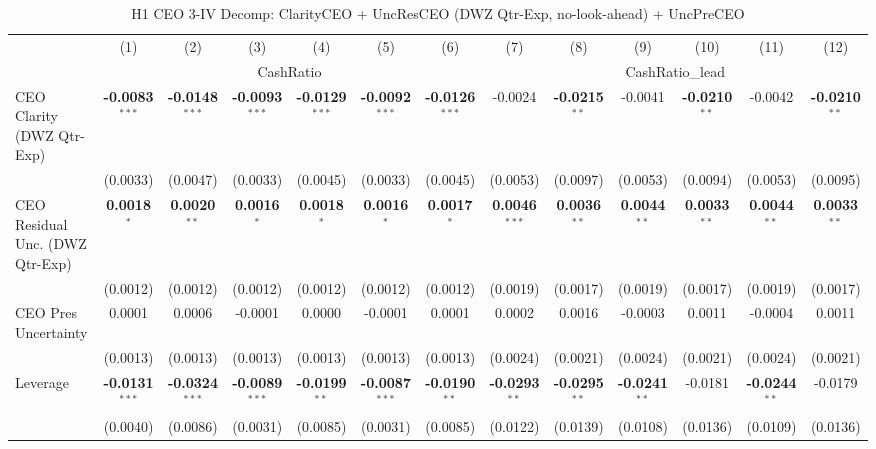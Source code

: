 \begin{landscape}
\begin{table}[H]
\setlength{\tabcolsep}{3pt}
\renewcommand{\arraystretch}{0.85}
\centering
\caption{H1 CEO 3-IV Decomp: ClarityCEO + UncResCEO (DWZ Qtr-Exp, no-look-ahead) + UncPreCEO}
\label{tab:h1_ceo2_decomp_qtrexp}
\scriptsize
\begin{tabular}{lcccccccccccc}
\toprule
 & (1) & (2) & (3) & (4) & (5) & (6) & (7) & (8) & (9) & (10) & (11) & (12) \\
 & \multicolumn{6}{c}{CashRatio} & \multicolumn{6}{c}{CashRatio\_lead} \\
\cmidrule(lr){2-7} \cmidrule(lr){8-13}
\midrule
CEO Clarity (DWZ Qtr-Exp) & \textbf{-0.0083}$^{***}$ & \textbf{-0.0148}$^{***}$ & \textbf{-0.0093}$^{***}$ & \textbf{-0.0129}$^{***}$ & \textbf{-0.0092}$^{***}$ & \textbf{-0.0126}$^{***}$ & -0.0024 & \textbf{-0.0215}$^{**}$ & -0.0041 & \textbf{-0.0210}$^{**}$ & -0.0042 & \textbf{-0.0210}$^{**}$ \\
 & (0.0033) & (0.0047) & (0.0033) & (0.0045) & (0.0033) & (0.0045) & (0.0053) & (0.0097) & (0.0053) & (0.0094) & (0.0053) & (0.0095) \\
CEO Residual Unc. (DWZ Qtr-Exp) & \textbf{0.0018}$^{*}$ & \textbf{0.0020}$^{**}$ & \textbf{0.0016}$^{*}$ & \textbf{0.0018}$^{*}$ & \textbf{0.0016}$^{*}$ & \textbf{0.0017}$^{*}$ & \textbf{0.0046}$^{***}$ & \textbf{0.0036}$^{**}$ & \textbf{0.0044}$^{**}$ & \textbf{0.0033}$^{**}$ & \textbf{0.0044}$^{**}$ & \textbf{0.0033}$^{**}$ \\
 & (0.0012) & (0.0012) & (0.0012) & (0.0012) & (0.0012) & (0.0012) & (0.0019) & (0.0017) & (0.0019) & (0.0017) & (0.0019) & (0.0017) \\
CEO Pres Uncertainty & 0.0001 & 0.0006 & -0.0001 & 0.0000 & -0.0001 & 0.0001 & 0.0002 & 0.0016 & -0.0003 & 0.0011 & -0.0004 & 0.0011 \\
 & (0.0013) & (0.0013) & (0.0013) & (0.0013) & (0.0013) & (0.0013) & (0.0024) & (0.0021) & (0.0024) & (0.0021) & (0.0024) & (0.0021) \\
\midrule
Leverage & \textbf{-0.0131}$^{***}$ & \textbf{-0.0324}$^{***}$ & \textbf{-0.0089}$^{***}$ & \textbf{-0.0199}$^{**}$ & \textbf{-0.0087}$^{***}$ & \textbf{-0.0190}$^{**}$ & \textbf{-0.0293}$^{**}$ & \textbf{-0.0295}$^{**}$ & \textbf{-0.0241}$^{**}$ & -0.0181 & \textbf{-0.0244}$^{**}$ & -0.0179 \\
 & (0.0040) & (0.0086) & (0.0031) & (0.0085) & (0.0031) & (0.0085) & (0.0122) & (0.0139) & (0.0108) & (0.0136) & (0.0109) & (0.0136) \\

\end{tabular}
\end{table}
\end{landscape}
